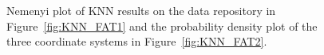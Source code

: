 \documentclass[11pt]{article}
\begin{document}
\begin{figure}[!h]
	\centering
	\caption{Nemenyi plot of KNN results on the data repository in Figure~\ref{fig:KNN_FAT1} and the probability density plot of the three coordinate systems in Figure~\ref{fig:KNN_FAT2}. }
	\label{fig:KNN_FAT}
\end{figure}
\end{document}
